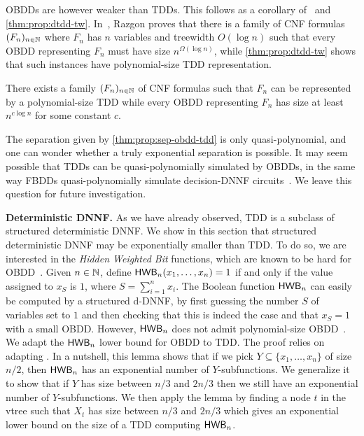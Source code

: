 \documentclass[a4paper,UKenglish,cleveref, autoref, thm-restate]{lipics-v2021}
\begin{document}
OBDDs are however weaker than TDDs. This follows as a corollary of~\cite{Razgon14} and \cref{thm:prop:dtdd-tw}. In~\cite{Razgon14}, Razgon proves that there is  a family of CNF formulas $(F_n)_{n \in \mathbb{N}}$ where $F_n$ has $n$ variables and treewidth $O(\log n)$ such that every OBDD representing $F_n$ must have size $n^{\Omega(\log n)}$, while \cref{thm:prop:dtdd-tw} shows that such instances have polynomial-size TDD representation.

\begin{theorem}
	\label{thm:prop:sep-obdd-tdd}
	There exists a family $(F_n)_{n \in \mathbb{N}}$ of CNF formulas such that $F_n$ can be represented by a polynomial-size TDD while every OBDD representing $F_n$ has size at least $n^{c \log n}$ for some constant $c$. 
\end{theorem}

The separation given by \cref{thm:prop:sep-obdd-tdd} is only quasi-polynomial, and one can wonder whether a truly exponential separation is possible. It may seem possible that TDDs can be quasi-polynomially simulated by OBDDs, in the same way FBDDs quasi-polynomially simulate decision-DNNF circuits~\cite{BeameLRS13}. We leave this question for future investigation.


\textbf{Deterministic DNNF.} As we have already observed, TDD is a subclass of structured deterministic DNNF. We show in this section that structured deterministic DNNF may be exponentially smaller than TDD. To do so, we are interested in the \emph{Hidden Weighted Bit} functions, which are known to be hard for OBDD~\cite{Wegener00}. Given $n \in \mathbb{N}$, define $ \mathsf{HWB}_n(x_1,\dots,x_n) = 1$ if and only if the value assigned to $x_S$ is $1$, where $S = \sum_{i=1}^n x_i$. The Boolean function $\mathsf{HWB}_n$ can easily be computed by a structured d-DNNF, by first guessing the number $S$ of variables set to $1$ and then checking that this is indeed the case and that $x_S=1$ with a small OBDD. However, $\mathsf{HWB}_n$ does not admit polynomial-size OBDD~\cite{Wegener00}. We adapt the $\mathsf{HWB}_n$ lower bound for OBDD to TDD. The proof relies on adapting \cite[Lemma 4.10.1]{Wegener00}. In a nutshell, this lemma shows that if we pick $Y \subseteq \{x_1,\dots,x_n\}$ of size $n/2$, then $\mathsf{HWB}_n$ has an exponential number of $Y$-subfunctions. We generalize it to show that if $Y$ has size between $n/3$ and $2n/3$ then we still have an exponential number of $Y$-subfunctions. We then apply the lemma by finding a node $t$ in the vtree such that $X_t$ has size between $n/3$ and $2n/3$ which gives an exponential lower bound on the size of a TDD computing $\mathsf{HWB}_n$.
\end{document}
